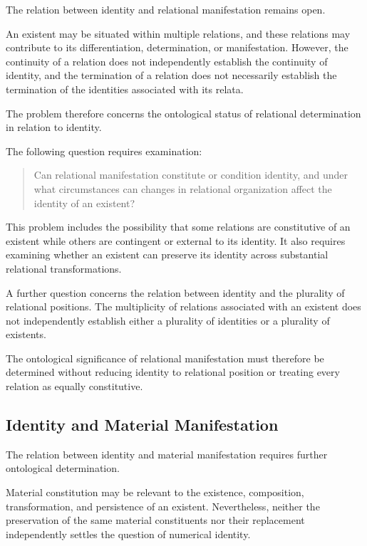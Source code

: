 The relation between identity and relational manifestation
remains open.

An existent may be situated within multiple relations,
and these relations may contribute to its differentiation,
determination, or manifestation. However, the continuity
of a relation does not independently establish the
continuity of identity, and the termination of a relation
does not necessarily establish the termination of the
identities associated with its relata.

The problem therefore concerns the ontological status
of relational determination in relation to identity.

The following question requires examination:

\begin{quote}
Can relational manifestation constitute or condition
identity, and under what circumstances can changes in
relational organization affect the identity of an existent?
\end{quote}

This problem includes the possibility that some relations
are constitutive of an existent while others are contingent
or external to its identity. It also requires examining
whether an existent can preserve its identity across
substantial relational transformations.

A further question concerns the relation between
identity and the plurality of relational positions.
The multiplicity of relations associated with an
existent does not independently establish either a
plurality of identities or a plurality of existents.

The ontological significance of relational manifestation
must therefore be determined without reducing identity
to relational position or treating every relation as
equally constitutive.


\subsection{Identity and Material Manifestation}

The relation between identity and material manifestation
requires further ontological determination.

Material constitution may be relevant to the existence,
composition, transformation, and persistence of an
existent. Nevertheless, neither the preservation of
the same material constituents nor their replacement
independently settles the question of numerical identity.

